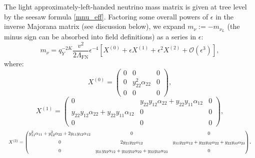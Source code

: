 \documentclass[11pt,letterpaper]{article}
\begin{document}
The light approximately-left-handed neutrino mass matrix is given at tree level by the seesaw formula \cref{mnu_eff}.
Factoring some overall powers of $\epsilon$ in the inverse Majorana matrix
(see discussion below), we expand $m_\nu:=-m_{\nu_L}$ (the minus sign can be
absorbed into field definitions)
as a series in $\epsilon$:
\begin{equation}  \label{eqn:mnu_expansion}
    m_\nu = q_Y^{-2K}\frac{v^2}{2\Lambda_{\text{FN}}} \epsilon^{-4} \left[X^{(0)} + \epsilon X^{(1)} + \epsilon^2 X^{(2)} + \mathcal{O}(\epsilon^3)\right], 
\end{equation}
where:
\begin{equation} \label{Lowest order - Unchanged}
    X^{(0)} = \begin{pmatrix}
        0 &  0  & 0 \\
        0  & y_{22}^2 \alpha_{22} &  0  \\
        0  & 0  & 0
    \end{pmatrix},
\end{equation}
\begin{equation}
    X^{(1)} = \begin{pmatrix}
        0 &   y_{22}y_{12}\alpha_{22}  + y_{22}y_{11}\alpha_{12}& 0 \\
        y_{22}y_{12}\alpha_{22} + y_{22}y_{11}\alpha_{12}   & 0 &  0  \\
        0  & 0  & 0
    \end{pmatrix}, 
\end{equation}
\begin{equation}
    \resizebox{1\textwidth}{!}{$
    X^{(2)} = \begin{pmatrix}
    y_{11}^2\alpha_{11} + y_{12}^2\alpha_{22} + 2y_{11}y_{12}\alpha_{12} & 0 & 0 \\[6pt]
    0 & 2y_{21}y_{22}\alpha_{12} & y_{31}y_{22}\alpha_{12} + y_{22}y_{32}\alpha_{22} + y_{22}y_{33}\alpha_{23}  \\[6pt]
    0 & y_{31}y_{22}\alpha_{12} + y_{22}y_{32}\alpha_{22} + y_{22}y_{33}\alpha_{23}  & 0
    \end{pmatrix}$}.
\end{equation}
\end{document}
